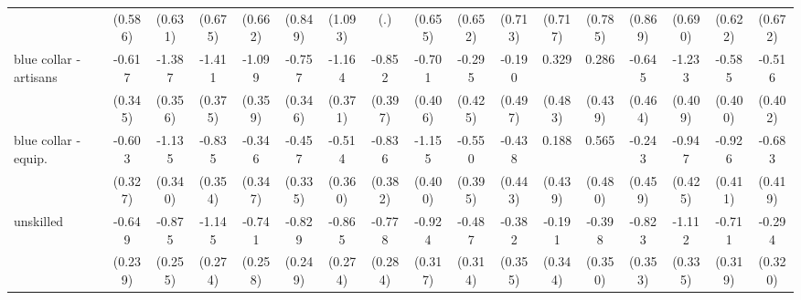 {\begin{tabular}{l*{16}{c}}
                    &     (0.586)         &     (0.631)         &     (0.675)         &     (0.662)         &     (0.849)         &     (1.093)         &         (.)         &     (0.655)         &     (0.652)         &     (0.713)         &     (0.717)         &     (0.785)         &     (0.869)         &     (0.690)         &     (0.622)         &     (0.672)         \\
[1em]
blue collar - artisans&      -0.617         &      -1.387\sym{***}&      -1.411\sym{***}&      -1.099\sym{**} &      -0.757\sym{*}  &      -1.164\sym{**} &      -0.852\sym{*}  &      -0.701         &      -0.295         &      -0.190         &       0.329         &       0.286         &      -0.645         &      -1.233\sym{**} &      -0.585         &      -0.516         \\
                    &     (0.345)         &     (0.356)         &     (0.375)         &     (0.359)         &     (0.346)         &     (0.371)         &     (0.397)         &     (0.406)         &     (0.425)         &     (0.497)         &     (0.483)         &     (0.439)         &     (0.464)         &     (0.409)         &     (0.400)         &     (0.402)         \\
[1em]
blue collar - equip.&      -0.603         &      -1.135\sym{***}&      -0.835\sym{*}  &      -0.346         &      -0.457         &      -0.514         &      -0.836\sym{*}  &      -1.155\sym{**} &      -0.550         &      -0.438         &       0.188         &       0.565         &      -0.243         &      -0.947\sym{*}  &      -0.926\sym{*}  &      -0.683         \\
                    &     (0.327)         &     (0.340)         &     (0.354)         &     (0.347)         &     (0.335)         &     (0.360)         &     (0.382)         &     (0.400)         &     (0.395)         &     (0.443)         &     (0.439)         &     (0.480)         &     (0.459)         &     (0.425)         &     (0.411)         &     (0.419)         \\
[1em]
unskilled           &      -0.649\sym{**} &      -0.875\sym{***}&      -1.145\sym{***}&      -0.741\sym{**} &      -0.829\sym{***}&      -0.865\sym{**} &      -0.778\sym{**} &      -0.924\sym{**} &      -0.487         &      -0.382         &      -0.191         &      -0.398         &      -0.823\sym{*}  &      -1.112\sym{***}&      -0.711\sym{*}  &      -0.294         \\
                    &     (0.239)         &     (0.255)         &     (0.274)         &     (0.258)         &     (0.249)         &     (0.274)         &     (0.284)         &     (0.317)         &     (0.314)         &     (0.355)         &     (0.344)         &     (0.350)         &     (0.353)         &     (0.335)         &     (0.319)         &     (0.320)         \\

\end{tabular}}
